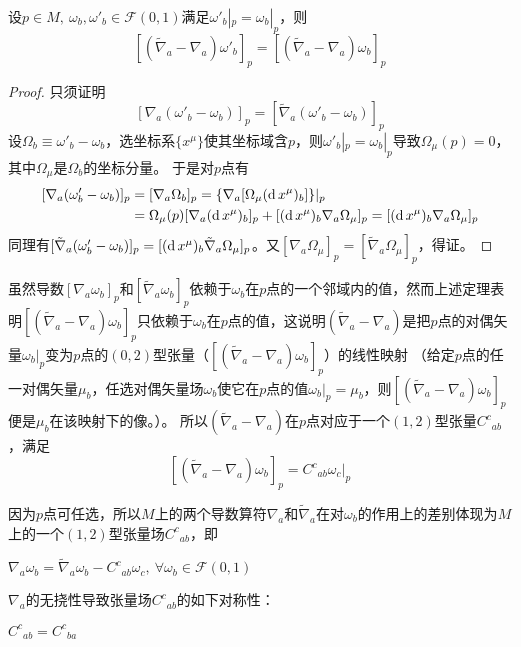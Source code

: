 \begin{theorem}
设$p \in M, ~ \omega_b, \omega'_b \in \mathscr{F}(0, 1)$满足$\omega'_b|_p = \omega_b|_p$，则
$$[(\tilde\nabla_a - \nabla_a)\omega'_b]_p = [(\tilde\nabla_a - \nabla_a)\omega_b]_p$$
\end{theorem}

\begin{proof}
只须证明
$$[\nabla_a(\omega'_b - \omega_b)]_p = [\tilde\nabla_a(\omega'_b - \omega_b)]_p$$
设$\Omega_b \equiv \omega'_b - \omega_b$，选坐标系$\{x^\mu\}$使其坐标域含$p$，则$\omega'_b|_p = \omega_b|_p$导致$\Omega_\mu(p) = 0$，其中$\Omega_\mu$是$\Omega_b$的坐标分量。
于是对$p$点有
$$\begin{aligned}[]
[\nabla_a(\omega'_b - \omega_b)]_p & = [\nabla_a\Omega_b]_p = \{\nabla_a[\Omega_\mu(\diff x^\mu)_b]\}|_p \\
& = \Omega_\mu(p)[\nabla_a(\diff x^\mu)_b]_p + [(\diff x^\mu)_b\nabla_a\Omega_\mu]_p = [(\diff x^\mu)_b\nabla_a\Omega_\mu]_p
\end{aligned}$$
同理有$[\tilde\nabla_a(\omega'_b - \omega_b)]_p = [(\operatorname{d} x^\mu)_b\tilde\nabla_a\Omega_\mu]_p$。又$[\nabla_a\Omega_\mu]_p = [\tilde\nabla_a\Omega_\mu]_p$，得证。
\end{proof}

虽然导数$[\nabla_a\omega_b]_p$和$[\tilde\nabla_a\omega_b]_p$依赖于$\omega_b$在$p$点的一个邻域内的值，然而上述定理表明$[(\tilde\nabla_a - \nabla_a)\omega_b]_p$只依赖于$\omega_b$在$p$点的值，这说明$(\tilde\nabla_a - \nabla_a)$是把$p$点的对偶矢量$\omega_b|_p$变为$p$点的$(0, 2)$型张量（$[(\tilde\nabla_a - \nabla_a)\omega_b]_p$）的线性映射
（给定$p$点的任一对偶矢量$\mu_b$，任选对偶矢量场$\omega_b$使它在$p$点的值$\omega_b|_p = \mu_b$，则$[(\tilde\nabla_a - \nabla_a)\omega_b]_p$便是$\mu_b$在该映射下的像。）。
所以$(\tilde\nabla_a - \nabla_a)$在$p$点对应于一个$(1, 2)$型张量$C^c{}_{ab}$，满足
$$[(\tilde\nabla_a - \nabla_a)\omega_b]_p = C^c{}_{ab}\omega_c|_p$$

因为$p$点可任选，所以$M$上的两个导数算符$\nabla_a$和$\tilde\nabla_a$在对$\omega_b$的作用上的差别体现为$M$上的一个$(1, 2)$型张量场$C^c{}_{ab}$，即
\begin{theorem}
$\nabla_a\omega_b = \tilde\nabla_a\omega_b - C^c{}_{ab}\omega_c, ~ \forall \omega_b \in \mathscr{F}(0, 1)$
\end{theorem}

$\nabla_a$的无挠性导致张量场$C^c{}_{ab}$的如下对称性：
\begin{theorem}
$C^c{}_{ab} = C^c{}_{ba}$
\end{theorem}

